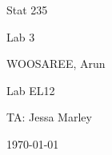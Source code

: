 \documentclass[letterpaper]{article}
\begin{document}
\begin{titlepage}
 \begin{center}
  \vspace*{1cm}
  \Huge
  Stat 235
  \vspace{1cm}
  
  Lab 3
  \vspace{1cm}
  
  WOOSAREE, Arun
  \vspace{1cm}
  
  \Huge
  Lab EL12
  \vspace{1cm}
  
  TA: Jessa Marley
  \vspace{1cm}
  
  \today
  \vfill
 \end{center}
\end{titlepage}

\section{}%

\section{}%

\subsection{}%

\subsection{}%

\subsection{}%
\end{document}
